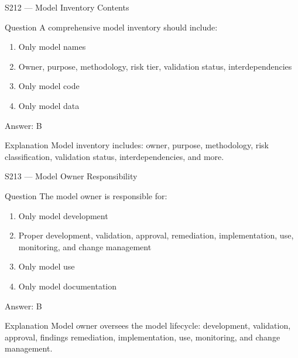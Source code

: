 \documentclass[aspectratio=169,8pt]{beamer}
\begin{document}
	\begin{frame}{S212 --- Model Inventory Contents}
		\begin{block}{Question}
			A comprehensive model inventory should include:
			\begin{enumerate}
				\item Only model names
				\item Owner, purpose, methodology, risk tier, validation status, interdependencies
				\item Only model code
				\item Only model data
			\end{enumerate}
		\end{block}
		\begin{exampleblock}{Answer: B}\end{exampleblock}
		\begin{block}{Explanation}
			Model inventory includes: owner, purpose, methodology, risk classification, validation status, interdependencies, and more.
		\end{block}
	\end{frame}
	
	\begin{frame}{S213 --- Model Owner Responsibility}
		\begin{block}{Question}
			The model owner is responsible for:
			\begin{enumerate}
				\item Only model development
				\item Proper development, validation, approval, remediation, implementation, use, monitoring, and change management
				\item Only model use
				\item Only model documentation
			\end{enumerate}
		\end{block}
		\begin{exampleblock}{Answer: B}\end{exampleblock}
		\begin{block}{Explanation}
			Model owner oversees the model lifecycle: development, validation, approval, findings remediation, implementation, use, monitoring, and change management.
		\end{block}
	\end{frame}
	
\end{document}
